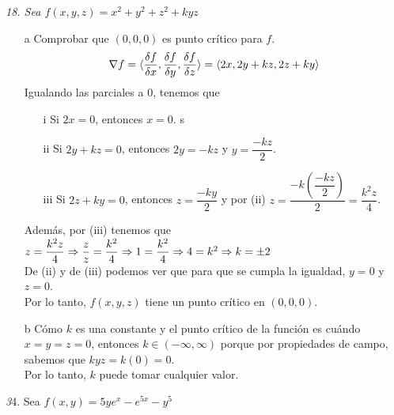 \documentclass[a4paper,12pt]{article}
\begin{document}
\textit{18. Sea $f(x,y,z) = x^2 + y^2 + z^2 + kyz$}
\begin{itemize}
	\item[a] Comprobar que $(0,0,0)$ es punto crítico para $f$.
	$$\nabla f = \langle \dfrac{\delta f}{\delta x}, \dfrac{\delta f}{\delta y}, \dfrac{\delta f}{\delta z}\rangle = \langle 2x, 2y + kz, 2z +ky \rangle$$
	Igualando las parciales a $0$, tenemos que
	\begin{itemize}
		\item[i] Si $2x = 0$, entonces $x = 0$.
	s	\item[ii] Si $2y + kz = 0$, entonces $2y = -kz$ y $y = \dfrac{-kz}{2}$.
		\item[iii] Si $2z + ky = 0$, entonces $z = \dfrac{-ky}{2}$ y por (ii) $z = \dfrac{-k (\dfrac{-kz}{2})}{2} = \dfrac{k^2z}{4}$.
	\end{itemize}
	Además, por (iii) tenemos que $z = \dfrac{k^2z}{4} \Rightarrow \dfrac{z}{z} = \dfrac{k^2}{4} \Rightarrow 1 = \dfrac{k^2}{4} \\ \Rightarrow 4 = k^2 \Rightarrow k = \pm 2$\\
	De (ii) y de (iii) podemos ver que para que se cumpla la igualdad, $y = 0$ y $z = 0$.\\
	Por lo tanto, $f(x,y,z)$ tiene un punto crítico en  $(0,0,0)$.
	\item[b] Cómo $k$ es una constante y el punto crítico de la función es cuándo $x = y = z = 0$, entonces $k \in (-\infty, \infty)$ porque por propiedades de campo, sabemos que $kyz = k(0) = 0$.\\
	Por lo tanto, $k$ puede tomar cualquier valor.\\
\end{itemize}
\textit 34. Sea $f(x,y) = 5ye^x - e^{5x} -y^5$
\end{document}
